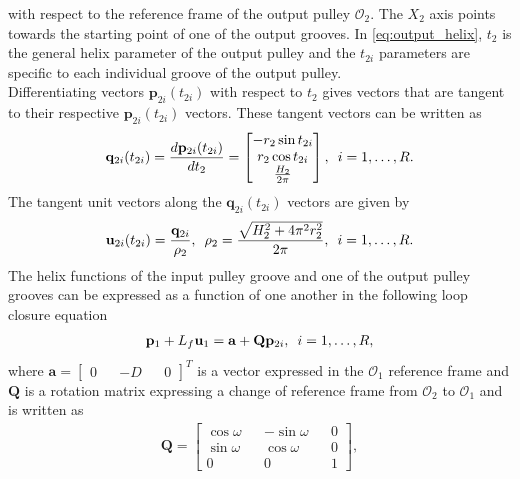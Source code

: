   with respect to the reference frame of the output pulley $\mathcal{O}_2$. The $X_2$ axis points towards the starting point of one of the output grooves. In \eqref{eq:output_helix}, $t_2$ is the general helix parameter of the output pulley and the $t_{2i}$ parameters are specific to each individual groove of the output pulley. \\ 
  Differentiating vectors $\mathbf{p}_{2i}(t_{2i})$ with respect to $t_{2}$ gives vectors that are tangent to their respective $\mathbf{p}_{2i}(t_{2i})$ vectors. These tangent vectors can be written as 
  \begin{align}
      \mathbf{q}_{2i}(t_{2i}) = \frac{d \mathbf{p}_{2i}(t_{2i})}{dt_{2}}=\begin{bmatrix}
      -r_2\sin t_{2i}\\
      r_2\cos t_{2i}\\
      \frac{H_2}{2\pi}
      \end{bmatrix},\hspace{0.5em}i =1 ,\ldots , R.
  \end{align}
  The tangent unit vectors along the $\mathbf{q}_{2i}(t_{2i})$ vectors are given by
  \begin{align}
      \mathbf{u}_{2i}(t_{2i}) = \frac{\mathbf{q}_{2i}}{\rho_2},\hspace{0.5em} \rho_2 = \frac{\sqrt{H_2^2+4\pi^2r_2^2}}{2\pi}, \hspace{0.5em} i = 1 ,\ldots , R.
  \end{align}
  The helix functions of the input pulley groove and one of the output pulley grooves can be expressed as a function of one another in the following loop closure equation
  \begin{align}
      \mathbf{p}_1 + L_f\mathbf{u}_1 = \mathbf{a}+\mathbf{Q}\mathbf{p}_{2i}, \hquad i =1 ,\ldots , R,
      \label{eq:loop_closure}
  \end{align}
  where $\mathbf{a}=\begin{bmatrix}0 && -D  && 0\end{bmatrix}^T$ is a vector expressed in the $\mathcal{O}_1$ reference frame and $\mathbf{Q}$ is a rotation matrix expressing a change of reference frame from $\mathcal{O}_2$ to $\mathcal{O}_1$ and is written as \begin{align}
  \mathbf{Q} =
  \begin{bmatrix}
  \cos \omega && -\sin \omega && 0\\
  \sin \omega && \cos \omega && 0\\
  0 && 0 && 1
  \end{bmatrix},
  \end{align}
